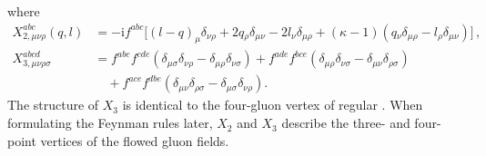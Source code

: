where
\begin{equation}
  \begin{split}
  X_{2,\mu \nu \rho}^{abc}(q,l) &= -\mathrm{i} f^{a b c} \big[
  (l-q)_\mu \delta_{\nu \rho} + 2q{}_{\rho} \delta_{\mu \nu}- 2l{}_{\nu}
  \delta_{\mu \rho} + (\kappa - 1) ( q{}_{\nu} \delta_{\mu
    \rho} -l{}_{\rho} \delta_{\mu \nu}) \big]\,,\\
  X_{3,\mu \nu \rho \sigma}^{abcd} &= f^{abe}
  f^{cde}(\delta_{\mu \sigma} \delta_{\nu \rho} - \delta_{\mu \rho}
  \delta_{\nu \sigma}) + f^{ade} f^{bce}(\delta_{\mu \rho}
  \delta_{\nu \sigma}- \delta_{\mu \nu} \delta_{\rho \sigma})\\&\quad
  + f^{ace} f^{dbe}(\delta_{\mu \nu} \delta_{\rho \sigma}-
  \delta_{\mu \sigma} \delta_{\nu \rho}).
  \end{split}
\end{equation}
The structure of $X_3$ is identical to the four-gluon vertex of regular
\qcd. When formulating the Feynman rules later, $X_2$ and $X_3$ describe
the three- and four-point vertices of the flowed gluon fields.

